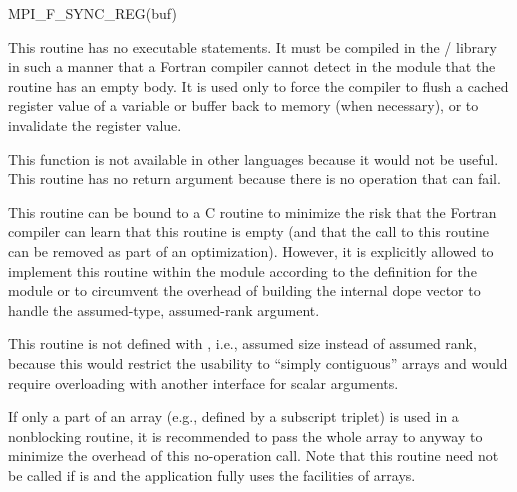 \begin{funcdef}{MPI\_F\_SYNC\_REG}{(\mbox{buf})}
\end{funcdef}

This routine has no executable statements. It must be compiled in the \MPI/ library
in such a manner that a Fortran compiler cannot detect in the module that the routine
has an empty body.
It is used only to force the compiler to flush a cached register value of a variable or buffer
back to memory (when necessary), or to invalidate the register value.

\begin{rationale}
This function is not available in other languages
because it would not be useful.
This routine has no  return argument because
there is no operation that can fail.
\end{rationale}

\begin{implementors}
This routine can be bound to a C routine to minimize
the risk that the Fortran compiler can learn that this routine is empty
(and that the call to this routine can be removed
as part of an optimization).
However, it is explicitly allowed to implement this routine within the
 module according to the definition
for the  module or  to circumvent
the overhead of building the internal dope vector to handle
the assumed-type, assumed-rank argument.
\end{implementors}

\begin{rationale}
This routine is not defined with ,
i.e., assumed size instead of assumed rank, because this
would restrict the usability to ``simply contiguous'' arrays
and would require overloading with another interface for
scalar arguments.
\end{rationale}

\begin{users}
If only a part of an array (e.g., defined by a subscript triplet)
is used in a nonblocking routine,
it is recommended to pass the whole array to 
anyway to minimize the overhead of this no-operation call.
Note that this routine need not be called
if  is  and
the application fully uses the facilities of  arrays.
\end{users}


